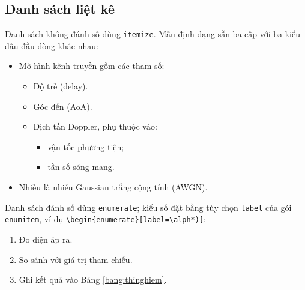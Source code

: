 \subsection{Danh sách liệt kê}
Danh sách không đánh số dùng \texttt{itemize}. Mẫu định dạng sẵn ba cấp với ba kiểu dấu đầu dòng khác nhau:
\begin{itemize}
    \item Mô hình kênh truyền gồm các tham số:
    \begin{itemize}
        \item Độ trễ (delay).
        \item Góc đến (AoA).
        \item Dịch tần Doppler, phụ thuộc vào:
        \begin{itemize}
            \item vận tốc phương tiện;
            \item tần số sóng mang.
        \end{itemize}
    \end{itemize}
    \item Nhiễu là nhiễu Gaussian trắng cộng tính (AWGN).
\end{itemize}
Danh sách đánh số dùng \texttt{enumerate}; kiểu số đặt bằng tùy chọn \texttt{label} của gói \texttt{enumitem}, ví dụ \verb|\begin{enumerate}[label=\alph*)]|:
\begin{enumerate}[label=\alph*)]
    \item Đo điện áp ra.
    \item So sánh với giá trị tham chiếu.
    \item Ghi kết quả vào Bảng \ref{bang:thinghiem}.
\end{enumerate}

\clearpage
